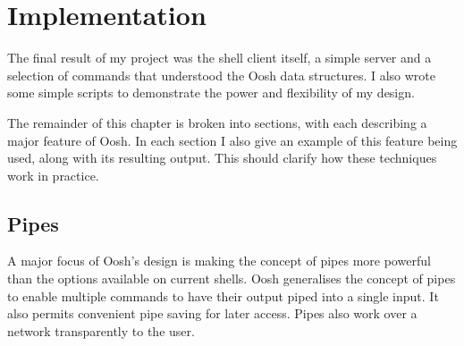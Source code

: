 \documentclass[12pt,twoside,notitlepage]{report}
\begin{document}





\cleardoublepage

\chapter{Implementation}
The final result of my project was the shell client itself, a simple server and
a selection of commands that understood the Oosh data structures. I also wrote
some simple scripts to demonstrate the power and flexibility of my design.

The remainder of this chapter is broken into sections, with each
describing a major feature of Oosh. In each section I also give an example
of this feature being used, along with its resulting output. This
should clarify how these techniques work in practice.

\section{Pipes}
A major focus of Oosh's design is making the concept of pipes more powerful than
the options available on current shells. Oosh generalises the concept of pipes
to enable multiple commands to have their output piped into a single input. It
also permits convenient pipe saving for later access. Pipes also work over a
network transparently to the user.
\end{document}
